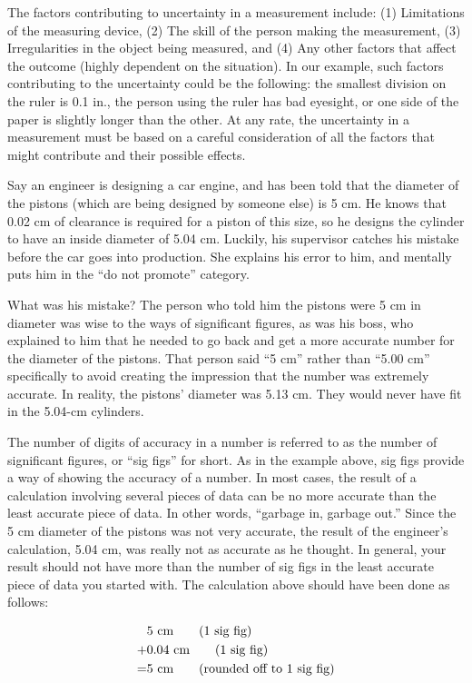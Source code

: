 The factors contributing to uncertainty in a measurement include: (1) Limitations of the measuring device, (2) The skill of the person making the measurement, (3) Irregularities in the object being measured, and (4) Any other factors that affect the outcome (highly dependent on the situation). In our example, such factors contributing to the uncertainty could be the following: the smallest division on the ruler is 0.1 in., the person using the ruler has bad eyesight, or one side of the paper is slightly longer than the other. At any rate, the uncertainty in a measurement must be based on a careful consideration of all the factors that might contribute and their possible effects.


Say an engineer is designing a car engine, and has been told
that the diameter of the pistons (which are being designed
by someone else) is 5 cm. He knows that 0.02 cm of clearance
is required for a piston of this size, so he designs the
cylinder to have an inside diameter of 5.04 cm. Luckily, his
supervisor catches his mistake before the car goes into
production. She explains his error to him, and mentally puts
him in the ``do not promote'' category.

What was his mistake? The person who told him the pistons
were 5 cm in diameter was wise to the ways of significant
figures, as was his boss, who explained to him that he
needed to go back and get a more accurate number for the
diameter of the pistons. That person said ``5 cm'' rather
than ``5.00 cm'' specifically to avoid creating the
impression that the number was extremely accurate. In
reality, the pistons' diameter was 5.13 cm. They would never
have fit in the 5.04-cm cylinders.

The number of digits of accuracy in a number is referred to
as the number of significant figures, or ``sig figs'' for
short. As in the example above, sig figs provide a way of
showing the accuracy of a number. In most cases, the result
of a calculation involving several pieces of data can be no
more accurate than the least accurate piece of data. In
other words, ``garbage in, garbage out.'' Since the 5 cm
diameter of the pistons was not very accurate, the result of
the engineer's calculation, 5.04 cm, was really not as
accurate as he thought. In general, your result should not
have more than the number of sig figs in the least accurate
piece of data you started with. The calculation above should
have been done as follows:

\begin{align*}
&5\ \textup{cm} \qquad    \text{(1 sig fig)}\\
+ &0.04\ \textup{cm}  \qquad  \text{(1 sig fig)}\\
= &5\ \textup{cm}   \qquad  \text{(rounded off to 1 sig fig)}
\end{align*}

